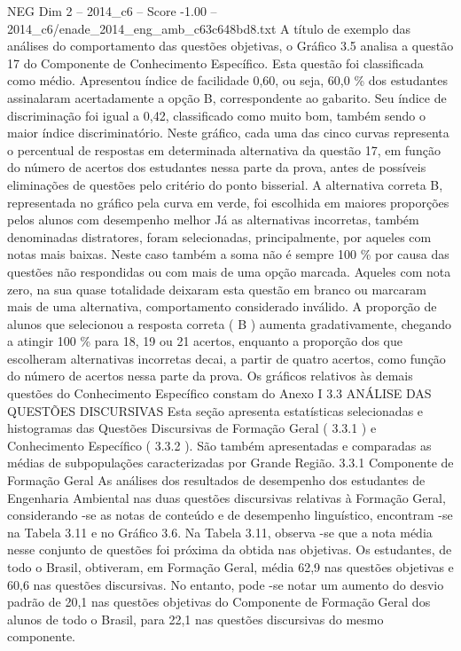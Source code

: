 \begin{textsample}{NEG Dim 2 – 2014\_c6 – Score -1.00 – 2014\_c6/enade\_2014\_eng\_amb\_c63c648bd8.txt}
A título de exemplo das análises do comportamento das questões objetivas, o Gráfico 3.5 analisa a questão 17 do Componente de Conhecimento Específico.
Esta questão foi classificada como médio.
Apresentou índice de facilidade 0,60, ou seja, 60,0 \% dos estudantes assinalaram acertadamente a opção B, correspondente ao gabarito.
Seu índice de discriminação foi igual a 0,42, classificado como muito bom, também sendo o maior índice discriminatório.
Neste gráfico, cada uma das cinco curvas representa o percentual de respostas em determinada alternativa da questão 17, em função do número de acertos dos estudantes nessa parte da prova, antes de possíveis eliminações de questões pelo critério do ponto bisserial.
A alternativa correta B, representada no gráfico pela curva em verde, foi escolhida em maiores proporções pelos alunos com desempenho melhor Já as alternativas incorretas, também denominadas distratores, foram selecionadas, principalmente, por aqueles com notas mais baixas.
Neste caso também a soma não é sempre 100 \% por causa das questões não respondidas ou com mais de uma opção marcada.
Aqueles com nota zero, na sua quase totalidade deixaram esta questão em branco ou marcaram mais de uma alternativa, comportamento considerado inválido.
A proporção de alunos que selecionou a resposta correta ( B ) aumenta gradativamente, chegando a atingir 100 \% para 18, 19 ou 21 acertos, enquanto a proporção dos que escolheram alternativas incorretas decai, a partir de quatro acertos, como função do número de acertos nessa parte da prova.
Os gráficos relativos às demais questões do Conhecimento Específico constam do Anexo I 3.3 ANÁLISE DAS QUESTÕES DISCURSIVAS Esta seção apresenta estatísticas selecionadas e histogramas das Questões Discursivas de Formação Geral ( 3.3.1 ) e Conhecimento Específico ( 3.3.2 ).
São também apresentadas e comparadas as médias de subpopulações caracterizadas por Grande Região. 3.3.1 Componente de Formação Geral As análises dos resultados de desempenho dos estudantes de Engenharia Ambiental nas duas questões discursivas relativas à Formação Geral, considerando -se as notas de conteúdo e de desempenho linguístico, encontram -se na Tabela 3.11 e no Gráfico 3.6.
Na Tabela 3.11, observa -se que a nota média nesse conjunto de questões foi próxima da obtida nas objetivas.
Os estudantes, de todo o Brasil, obtiveram, em Formação Geral, média 62,9 nas questões objetivas e 60,6 nas questões discursivas.
No entanto, pode -se notar um aumento do desvio padrão de 20,1 nas questões objetivas do Componente de Formação Geral dos alunos de todo o Brasil, para 22,1 nas questões discursivas do mesmo componente.

\end{textsample}
